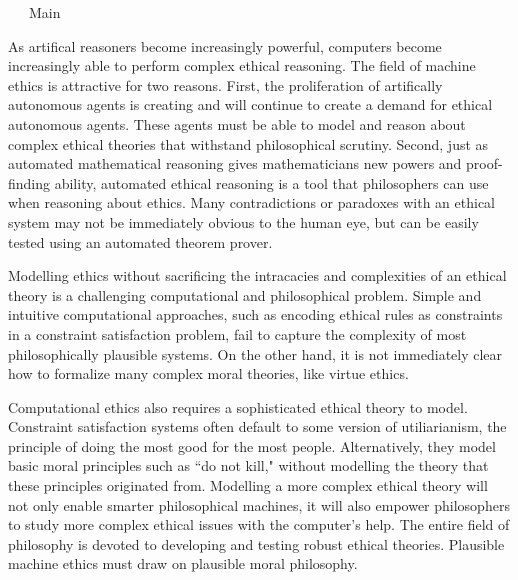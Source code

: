 %
\begin{isabellebody}%
%
%
\isadelimtheory
%
\endisadelimtheory
%
\isatagtheory
\ \ \ Main\isanewline
%
\endisatagtheory
{\isafoldtheory}%
%
\isadelimtheory
%
\endisadelimtheory
%
\isadelimdocument
%
\endisadelimdocument
%
\isatagdocument
%
\isamarkuptrue%
%
\endisatagdocument
{\isafolddocument}%
%
\isadelimdocument
%
\endisadelimdocument
%
\begin{isamarkuptext}%
As artifical reasoners become increasingly powerful, computers become increasingly able to 
perform complex ethical reasoning. The field of machine ethics \cite{mesurvey} is attractive for two reasons.
First, the proliferation of artifically autonomous agents is creating and will continue to create a demand for 
ethical autonomous agents. These agents must be able to model and reason about complex ethical theories 
that withstand philosophical scrutiny. Second, just as automated mathematical reasoning gives mathematicians
new powers and proof-finding ability, automated ethical reasoning is a tool that philosophers can use 
when reasoning about ethics. Many contradictions or paradoxes with an ethical system may not be 
immediately obvious to the human eye, but can be easily tested using an automated theorem prover.

Modelling ethics without sacrificing the intracacies and complexities of an ethical theory is a 
challenging computational and philosophical problem. Simple and intuitive computational approaches, 
such as encoding ethical rules as constraints in a constraint satisfaction problem, fail to capture
the complexity of most philosophically plausible systems. On the other hand, it is not immediately clear
how to formalize many complex moral theories, like virtue ethics.

Computational ethics also requires a sophisticated 
ethical theory to model. Constraint satisfaction systems often default to some version of utiliarianism, 
the principle of doing the most good for the most people. Alternatively, they model basic moral 
principles such as ``do not kill," without modelling the theory that these principles originated from.
Modelling a more complex ethical theory will not only enable smarter philosophical machines, it will
also empower philosophers to study more complex ethical issues with the computer's help. The entire
field of philosophy is devoted to developing and testing robust ethical theories. Plausible machine
ethics must draw on plausible moral philosophy.


\end{isamarkuptext}
\end{isabellebody}
